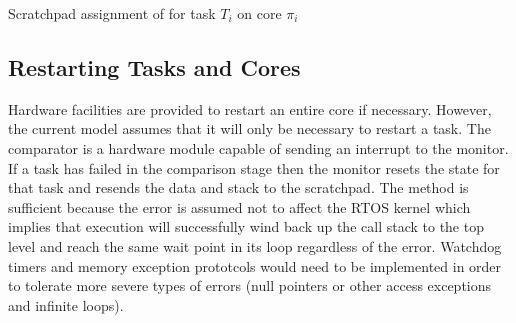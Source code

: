 \begin{algorithm}
\caption{Scratchpad assignment of for task $T_i$ on core $\pi_i$}
\label{a:scratchpad}
\end{algorithm}

\subsection{Restarting Tasks and Cores}

	Hardware facilities are provided to restart an entire core if necessary. 
	However, the current model assumes that it will only be necessary to restart a task.
	The comparator is a hardware module capable of sending an interrupt to the monitor. 
	If a task has failed in the comparison stage then the monitor resets the state for that task and resends the data and stack to the scratchpad.
	The method is sufficient because the error is assumed not to affect the RTOS kernel which implies that execution will successfully wind back up the call stack to the top level and reach the same wait point in its loop regardless of the error.
	Watchdog timers and memory exception prototcols would need to be implemented in order to tolerate more severe types of errors (null pointers or other access exceptions and infinite loops).



